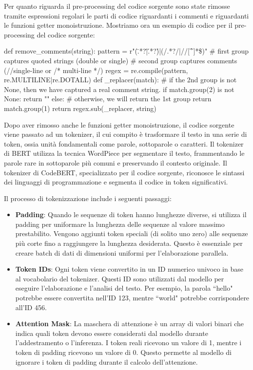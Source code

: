 \documentclass[../../Thesis.tex]{subfiles}
\begin{document}
Per quanto riguarda il pre-processing del codice sorgente sono state rimosse tramite espressioni regolari le parti di codice riguardanti i commenti e riguardanti le funzioni getter monoistruzione. Mostriamo ora un esempio di codice per il pre-processing del codice sorgente:
\begin{python}
    def remove_comments(string):
    pattern = r"(\".*?\"|\'.*?\')|(/\*.*?\*/|//[^\r\n]*\$)"
    # first group captures quoted strings (double or single)
    # second group captures comments (//single-line or /* multi-line */)
    regex = re.compile(pattern, re.MULTILINE|re.DOTALL)
    def _replacer(match):
        # if the 2nd group is not None, then we have captured a real comment string.
        if match.group(2) is not None:
            return ""
        else: # otherwise, we will return the 1st group
            return match.group(1)
    return regex.sub(_replacer, string)
\end{python}
Dopo aver rimosso anche le funzioni getter monoistruzione, il codice sorgente viene passato ad un tokenizer, il cui compito \`e trasformare il testo in una serie di token, ossia unit\`a fondamentali come parole, sottoparole o caratteri. Il tokenizer di BERT utilizza la tecnica WordPiece per segmentare il testo, frammentando le parole rare in sottoparole pi\`u comuni e preservando il contesto originale. Il tokenizer di CodeBERT, specializzato per il codice sorgente, riconosce le sintassi dei linguaggi di programmazione e segmenta il codice in token significativi.

Il processo di tokenizzazione include i seguenti passaggi:

\begin{itemize}
    \item \textbf{Padding}: Quando le sequenze di token hanno lunghezze diverse, si utilizza il padding per uniformare la lunghezza delle sequenze al valore massimo prestabilito. Vengono aggiunti token speciali (di solito uno zero) alle sequenze pi\`u corte fino a raggiungere la lunghezza desiderata. Questo \`e essenziale per creare batch di dati di dimensioni uniformi per l'elaborazione parallela.
    
    \item \textbf{Token IDs}: Ogni token viene convertito in un ID numerico univoco in base al vocabolario del tokenizer. Questi ID sono utilizzati dal modello per eseguire l'elaborazione e l'analisi del testo. Per esempio, la parola ``hello" potrebbe essere convertita nell'ID 123, mentre ``world" potrebbe corrispondere all'ID 456.
    
    \item \textbf{Attention Mask}: La maschera di attenzione \`e un array di valori binari che indica quali token devono essere considerati dal modello durante l'addestramento o l'inferenza. I token reali ricevono un valore di 1, mentre i token di padding ricevono un valore di 0. Questo permette al modello di ignorare i token di padding durante il calcolo dell'attenzione.
\end{itemize}
\end{document}
